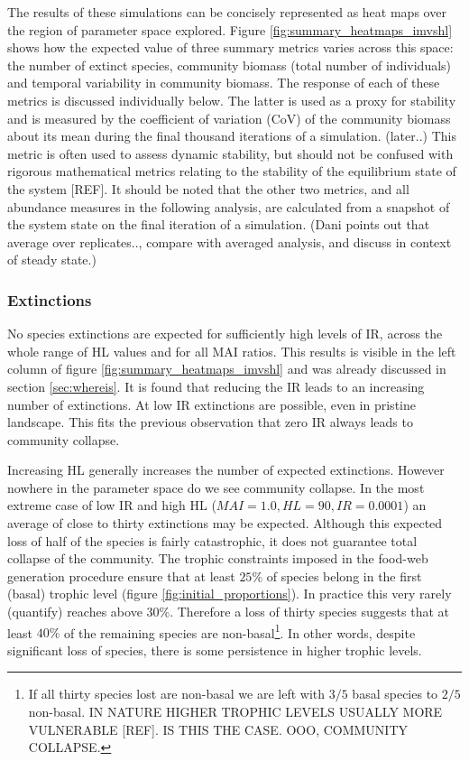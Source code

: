 \begin{itemize}
The results of these simulations can be concisely represented as heat maps over the region of parameter space explored. Figure \ref{fig:summary_heatmaps_imvshl} shows how the expected value of three summary metrics varies across this space: the number of extinct species, community biomass (total number of individuals) and temporal variability in community biomass. The response of each of these metrics is discussed individually below. The latter is used as a proxy for stability and is measured by the coefficient of variation (CoV) of the community biomass about its mean during the final thousand iterations of a simulation. (later..) This metric is often used to assess dynamic stability, but should not be confused with rigorous mathematical metrics relating to the stability of the equilibrium state of the system [REF]. It should be noted that the other two metrics, and all abundance measures in the following analysis, are calculated from a snapshot of the system state on the final iteration of a simulation. (Dani points out that average over replicates.., compare with averaged analysis, and discuss in context of steady state.) 

\subsubsection*{Extinctions}

No species extinctions are expected for sufficiently high levels of IR, across the whole range of HL values and for all MAI ratios. This results is visible in the left column of figure \ref{fig:summary_heatmaps_imvshl} and was already discussed in section \ref{sec:whereis}. It is found that reducing the IR leads to an increasing number of extinctions. At low IR extinctions are possible, even in pristine landscape. This fits the previous observation that zero IR always leads to community collapse.

Increasing HL generally increases the number of expected extinctions. However nowhere in the parameter space do we see community collapse. In the most extreme case of low IR and high HL ($MAI=1.0,HL=90,IR=0.0001$) an average of close to thirty extinctions may be expected. Although this expected loss of half of the species is fairly catastrophic, it does not guarantee total collapse of the community. The trophic constraints imposed in the food-web generation procedure ensure that at least $25\%$ of species belong in the first (basal) trophic level (figure \ref{fig:initial_proportions}). In practice this very rarely (quantify) reaches above $30\%$. Therefore a loss of thirty species suggests that at least $40\%$ of the remaining species are non-basal\footnote{If all thirty species lost are non-basal we are left with $3/5$ basal species to $2/5$ non-basal. IN NATURE HIGHER TROPHIC LEVELS USUALLY MORE VULNERABLE [REF]. IS THIS THE CASE. OOO, COMMUNITY COLLAPSE.}. In other words, despite significant loss of species, there is some persistence in higher trophic levels. 


\end{itemize}

